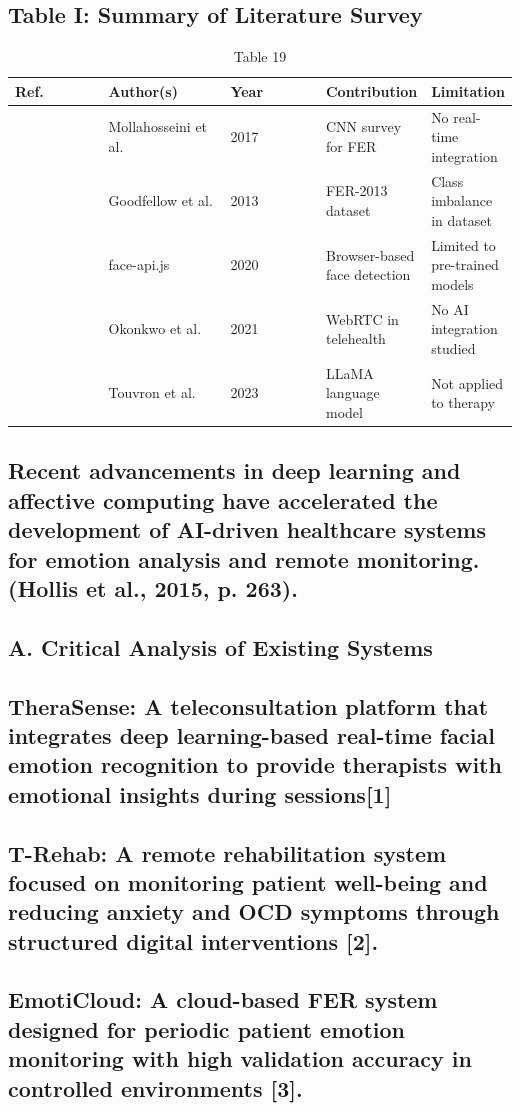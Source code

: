 \documentclass[conference]{IEEEtran}
\begin{document}
\subsection{Table I: Summary of Literature Survey}
\begin{table}[t]
\centering
\caption{Table 19}
\begin{tabular}{|p{0.3\linewidth}|p{0.3\linewidth}|p{0.3\linewidth}|p{0.3\linewidth}|p{0.3\linewidth}|}
\hline
Ref. & Author(s) & Year & Contribution & Limitation \\
\hline
[4] & Mollahosseini et al. & 2017 & CNN survey for FER & No real-time integration \\
\hline
[5] & Goodfellow et al. & 2013 & FER-2013 dataset & Class imbalance in dataset \\
\hline
[7] & face-api.js & 2020 & Browser-based face detection & Limited to pre-trained models \\
\hline
[8] & Okonkwo et al. & 2021 & WebRTC in telehealth & No AI integration studied \\
\hline
[10] & Touvron et al. & 2023 & LLaMA language model & Not applied to therapy \\
\hline
\end{tabular}
\end{table}
\subsection{Recent advancements in deep learning and affective computing have accelerated the development of AI-driven healthcare systems for emotion analysis and remote monitoring.(Hollis et al., 2015, p. 263).}
\subsection{A. Critical Analysis of Existing Systems}
\subsection{TheraSense: A teleconsultation platform that integrates deep learning-based real-time facial emotion recognition to provide therapists with emotional insights during sessions[1]}
\subsection{T-Rehab: A remote rehabilitation system focused on monitoring patient well-being and reducing anxiety and OCD symptoms through structured digital interventions [2].}
\subsection{EmotiCloud: A cloud-based FER system designed for periodic patient emotion monitoring with high validation accuracy in controlled environments [3].}
\end{document}

